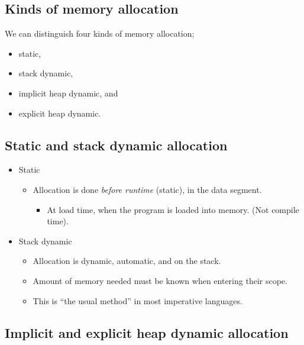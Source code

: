 \documentclass[11pt]{article}
\theoremstyle{definition}
\begin{document}
\subsection{Kinds of memory allocation}
\label{sec:orga863a67}

We can distinguish four kinds of memory allocation;
\begin{itemize}
\item static,
\item stack dynamic,
\item implicit heap dynamic, and
\item explicit heap dynamic.
\end{itemize}

\subsection{Static and stack dynamic allocation}
\label{sec:org8bbee00}

\begin{itemize}
\item Static
\begin{itemize}
\item Allocation is done \emph{before runtime} (static), in the data segment.
\begin{itemize}
\item At load time, when the program is loaded into memory.
(Not compile time).
\end{itemize}
\end{itemize}
\item Stack dynamic
\begin{itemize}
\item Allocation is dynamic, automatic, and on the stack.
\item Amount of memory needed must be known when entering their scope.
\item This is “the usual method” in most imperative languages.
\end{itemize}
\end{itemize}

\subsection{Implicit and explicit heap dynamic allocation}
\label{sec:orgaf64057}
\end{document}
